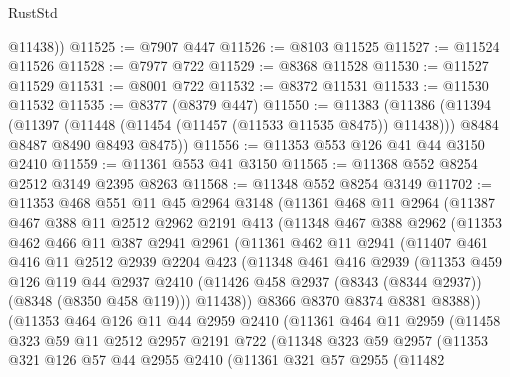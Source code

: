 \begin{lexlean}{RustStd}
\begin{coremodule}
{\begin{coremodule}
{{{{{{{{{{{{{{{{{{{{{{{{{{{{{{{{{{{{{{{{{{{{{{{{{{        @11438))
@11525 := @7907 @447
@11526 := @8103 @11525
@11527 := @11524 @11526
@11528 := @7977 @722
@11529 := @8368 @11528
@11530 := @11527 @11529
@11531 := @8001 @722
@11532 := @8372 @11531
@11533 := @11530 @11532
@11535 := @8377 (@8379 @447)
@11550 := @11383
    (@11386
      (@11394
        (@11397 (@11448 (@11454 (@11457 (@11533 @11535 @8475)) @11438)))
        @8484
        @8487
        @8490
        @8493
        @8475))
@11556 := @11353 @553 @126 @41 @44 @3150 @2410
@11559 := @11361 @553 @41 @3150
@11565 := @11368 @552 @8254 @2512 @3149 @2395 @8263
@11568 := @11348 @552 @8254 @3149
@11702 := @11353
    @468
    @551
    @11
    @45
    @2964
    @3148
    (@11361
      @468
      @11
      @2964
      (@11387
        @467
        @388
        @11
        @2512
        @2962
        @2191
        @413
        (@11348
          @467
          @388
          @2962
          (@11353
            @462
            @466
            @11
            @387
            @2941
            @2961
            (@11361
              @462
              @11
              @2941
              (@11407
                @461
                @416
                @11
                @2512
                @2939
                @2204
                @423
                (@11348
                  @461
                  @416
                  @2939
                  (@11353
                    @459
                    @126
                    @119
                    @44
                    @2937
                    @2410
                    (@11426 @458 @2937 (@8343 (@8344 @2937)) (@8348 (@8350 @458 @119)))
                    @11438))
                @8366
                @8370
                @8374
                @8381
                @8388))
            (@11353
              @464
              @126
              @11
              @44
              @2959
              @2410
              (@11361
                @464
                @11
                @2959
                (@11458
                  @323
                  @59
                  @11
                  @2512
                  @2957
                  @2191
                  @722
                  (@11348
                    @323
                    @59
                    @2957
                    (@11353
                      @321
                      @126
                      @57
                      @44
                      @2955
                      @2410
                      (@11361
                        @321
                        @57
                        @2955
                        (@11482
}}}}}}}}}}}}}}}}}}}}}}}}}}}}}}}}}}}}}}}}}}}}}}}}}}
\end{coremodule}}
\end{coremodule}
\end{lexlean}
